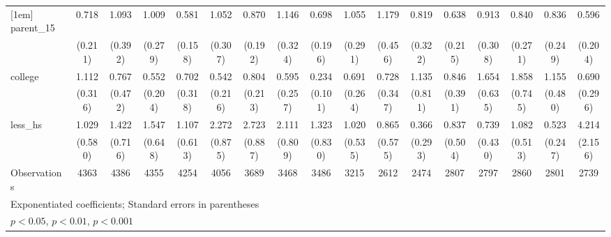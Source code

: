 {\begin{tabular}{l*{16}{c}}
[1em]
parent\_15           &       0.718         &       1.093         &       1.009         &       0.581\sym{*}  &       1.052         &       0.870         &       1.146         &       0.698         &       1.055         &       1.179         &       0.819         &       0.638         &       0.913         &       0.840         &       0.836         &       0.596         \\
                    &     (0.211)         &     (0.392)         &     (0.279)         &     (0.158)         &     (0.307)         &     (0.192)         &     (0.324)         &     (0.196)         &     (0.291)         &     (0.456)         &     (0.322)         &     (0.215)         &     (0.308)         &     (0.271)         &     (0.249)         &     (0.204)         \\
[1em]
college             &       1.112         &       0.767         &       0.552         &       0.702         &       0.542         &       0.804         &       0.595         &       0.234\sym{***}&       0.691         &       0.728         &       1.135         &       0.846         &       1.654         &       1.858         &       1.155         &       0.690         \\
                    &     (0.316)         &     (0.472)         &     (0.204)         &     (0.318)         &     (0.216)         &     (0.213)         &     (0.257)         &     (0.101)         &     (0.264)         &     (0.347)         &     (0.811)         &     (0.391)         &     (0.635)         &     (0.745)         &     (0.480)         &     (0.296)         \\
[1em]
less\_hs             &       1.029         &       1.422         &       1.547         &       1.107         &       2.272\sym{*}  &       2.723\sym{**} &       2.111         &       1.323         &       1.020         &       0.865         &       0.366         &       0.837         &       0.739         &       1.082         &       0.523         &       4.214\sym{**} \\
                    &     (0.580)         &     (0.716)         &     (0.648)         &     (0.613)         &     (0.875)         &     (0.887)         &     (0.809)         &     (0.830)         &     (0.535)         &     (0.575)         &     (0.293)         &     (0.504)         &     (0.430)         &     (0.513)         &     (0.247)         &     (2.156)         \\
\hline
Observations        &        4363         &        4386         &        4355         &        4254         &        4056         &        3689         &        3468         &        3486         &        3215         &        2612         &        2474         &        2807         &        2797         &        2860         &        2801         &        2739         \\
\hline\hline
\multicolumn{17}{l}{\footnotesize Exponentiated coefficients; Standard errors in parentheses}\\
\multicolumn{17}{l}{\footnotesize \sym{*} \(p<0.05\), \sym{**} \(p<0.01\), \sym{***} \(p<0.001\)}\\
\end{tabular}
}
